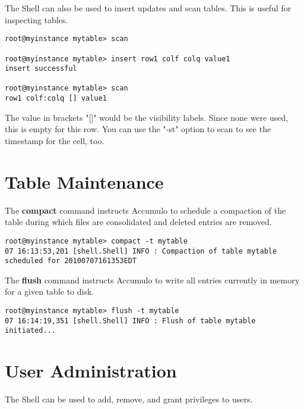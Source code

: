 The Shell can also be used to insert updates and scan tables. This is useful for
inspecting tables.

\small
\begin{verbatim}
root@myinstance mytable> scan

root@myinstance mytable> insert row1 colf colq value1
insert successful

root@myinstance mytable> scan
row1 colf:colq [] value1
\end{verbatim}
\normalsize

The value in brackets "[]" would be the visibility labels.  Since none were used, this is empty for this row.
You can use the "-st" option to scan to see the timestamp for the cell, too.

\section{Table Maintenance}

The \textbf{compact} command instructs Accumulo to schedule a compaction of the table during which
files are consolidated and deleted entries are removed.

\small
\begin{verbatim}
root@myinstance mytable> compact -t mytable
07 16:13:53,201 [shell.Shell] INFO : Compaction of table mytable
scheduled for 20100707161353EDT
\end{verbatim}
\normalsize

The \textbf{flush} command instructs Accumulo to write all entries currently in memory for a given table
to disk.

\small
\begin{verbatim}
root@myinstance mytable> flush -t mytable
07 16:14:19,351 [shell.Shell] INFO : Flush of table mytable
initiated...
\end{verbatim}
\normalsize

\section{User Administration}

The Shell can be used to add, remove, and grant privileges to users.

